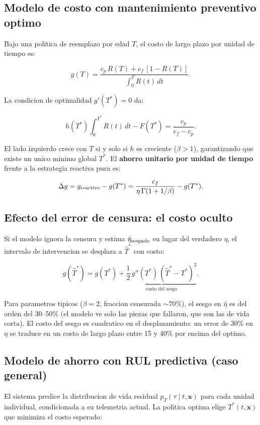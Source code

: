 \documentclass[11pt,a4paper]{article}
\begin{document}
\subsection{Modelo de costo con mantenimiento preventivo optimo}

Bajo una politica de reemplazo por edad $T$, el costo de largo plazo
por unidad de tiempo es:

$$g(T) = \frac{c_p\,R(T) + c_f\,[1-R(T)]}
  {\displaystyle\int_0^T R(t)\,dt}.$$

La condicion de optimalidad $g'(T^*) = 0$ da:

$$h(T^*)\int_0^{T^*} R(t)\,dt - F(T^*)
  = \frac{c_p}{c_f - c_p}.$$

El lado izquierdo crece con $T$ si y solo si $h$ es creciente ($\beta > 1$),
garantizando que existe un unico minimo global $T^*$. El \textbf{ahorro
unitario por unidad de tiempo} frente a la estrategia reactiva pura es:

$$\Delta g = g_{\rm reactivo} - g(T^*)
  = \frac{c_f}{\eta\,\Gamma(1+1/\beta)} - g(T^*).$$

\subsection{Efecto del error de censura: el costo oculto}

Si el modelo ignora la censura y estima $\hat{\eta}_{\rm sesgado}$
en lugar del verdadero $\eta$, el intervalo de intervencion se desplaza a
$\hat{T}^*$ con costo:

$$g(\hat{T}^*) = g(T^*) + \underbrace{\frac{1}{2}\,g''(T^*)\,(\hat{T}^* - T^*)^2}_{\text{costo del sesgo}}.$$

Para parametros tipicos ($\beta = 2$, fraccion censurada $\sim 70\%$), el
sesgo en $\hat{\eta}$ es del orden del 30--50\% (el modelo ve solo
las piezas que fallaron, que son las de vida corta). El costo del sesgo
es cuadratico en el desplazamiento: un error de 30\% en $\eta$
se traduce en un costo de largo plazo entre 15 y 40\% por encima del optimo.

\subsection{Modelo de ahorro con RUL predictiva (caso general)}

El sistema predice la distribucion de vida residual $p_T(\tau \mid t,\mathbf{x})$
para cada unidad individual, condicionada a su telemetria actual. La politica
optima elige $T^*(t, \mathbf{x})$ que minimiza el costo esperado:
\end{document}
